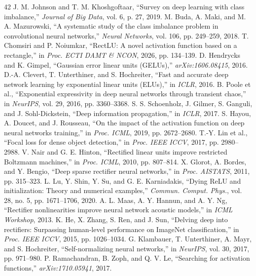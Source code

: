 \documentclass[10pt,a4paper]{article}
\begin{document}
\begin{thebibliography}{42}
 J. M. Johnson and T. M. Khoshgoftaar, ``Survey on deep learning with class imbalance,'' \textit{Journal of Big Data}, vol. 6, p. 27, 2019.
 M. Buda, A. Maki, and M. A. Mazurowski, ``A systematic study of the class imbalance problem in convolutional neural networks,'' \textit{Neural Networks}, vol. 106, pp. 249--259, 2018.
 T. Chomsiri and P. Noiumkar, ``RectLU: A novel activation function based on a rectangle,'' in \textit{Proc. ECTI DAMT \& NCON}, 2026, pp. 134--139.
 D. Hendrycks and K. Gimpel, ``Gaussian error linear units (GELUs),'' \textit{arXiv:1606.08415}, 2016.
 D.-A. Clevert, T. Unterthiner, and S. Hochreiter, ``Fast and accurate deep network learning by exponential linear units (ELUs),'' in \textit{ICLR}, 2016.
 B. Poole et al., ``Exponential expressivity in deep neural networks through transient chaos,'' in \textit{NeurIPS}, vol. 29, 2016, pp. 3360--3368.
 S. S. Schoenholz, J. Gilmer, S. Ganguli, and J. Sohl-Dickstein, ``Deep information propagation,'' in \textit{ICLR}, 2017.
 S. Hayou, A. Doucet, and J. Rousseau, ``On the impact of the activation function on deep neural networks training,'' in \textit{Proc. ICML}, 2019, pp. 2672--2680.
 T.-Y. Lin et al., ``Focal loss for dense object detection,'' in \textit{Proc. IEEE ICCV}, 2017, pp. 2980--2988.
 V. Nair and G. E. Hinton, ``Rectified linear units improve restricted Boltzmann machines,'' in \textit{Proc. ICML}, 2010, pp. 807--814.
 X. Glorot, A. Bordes, and Y. Bengio, ``Deep sparse rectifier neural networks,'' in \textit{Proc. AISTATS}, 2011, pp. 315--323.
 L. Lu, Y. Shin, Y. Su, and G. E. Karniadakis, ``Dying ReLU and initialization: Theory and numerical examples,'' \textit{Commun. Comput. Phys.}, vol. 28, no. 5, pp. 1671--1706, 2020.
 A. L. Maas, A. Y. Hannun, and A. Y. Ng, ``Rectifier nonlinearities improve neural network acoustic models,'' in \textit{ICML Workshop}, 2013.
 K. He, X. Zhang, S. Ren, and J. Sun, ``Delving deep into rectifiers: Surpassing human-level performance on ImageNet classification,'' in \textit{Proc. IEEE ICCV}, 2015, pp. 1026--1034.
 G. Klambauer, T. Unterthiner, A. Mayr, and S. Hochreiter, ``Self-normalizing neural networks,'' in \textit{NeurIPS}, vol. 30, 2017, pp. 971--980.
 P. Ramachandran, B. Zoph, and Q. V. Le, ``Searching for activation functions,'' \textit{arXiv:1710.05941}, 2017.

\end{thebibliography}
\end{document}

